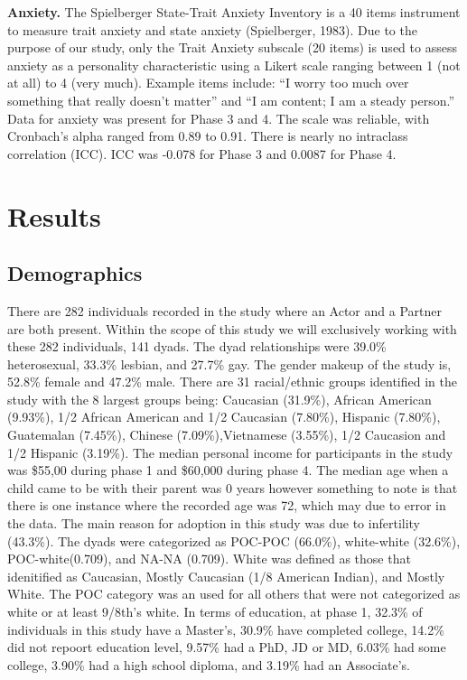 \documentclass[man]{apa6}
\begin{document}
\textbf{Anxiety.}
The Spielberger State-Trait Anxiety Inventory is a 40 items instrument to measure trait anxiety and state anxiety (Spielberger, 1983). Due to the purpose of our study, only the Trait Anxiety subscale (20 items) is used to assess anxiety as a personality characteristic using a Likert scale ranging between 1 (not at all) to 4 (very much). Example items include: \enquote{I worry too much over something that really doesn't matter} and \enquote{I am content; I am a steady person.} Data for anxiety was present for Phase 3 and 4. The scale was reliable, with Cronbach's alpha ranged from 0.89 to 0.91. There is nearly no intraclass correlation (ICC). ICC was -0.078 for Phase 3 and 0.0087 for Phase 4.

\hypertarget{results}{%
\section{Results}\label{results}}

\hypertarget{demographics}{%
\subsection{Demographics}\label{demographics}}

There are 282 individuals recorded in the study where an Actor and a Partner are both present. Within the scope of this study we will exclusively working with these 282 individuals, 141 dyads.
The dyad relationships were 39.0\% heterosexual, 33.3\% lesbian, and 27.7\% gay.
The gender makeup of the study is, 52.8\% female and 47.2\% male.
There are 31 racial/ethnic groups identified in the study with the 8 largest groups being: Caucasian (31.9\%), African American (9.93\%), 1/2 African American and 1/2 Caucasian (7.80\%), Hispanic (7.80\%), Guatemalan (7.45\%), Chinese (7.09\%),Vietnamese (3.55\%), 1/2 Caucasion and 1/2 Hispanic (3.19\%).
The median personal income for participants in the study was \$55,00 during phase 1 and \$60,000 during phase 4.
The median age when a child came to be with their parent was 0 years however something to note is that there is one instance where the recorded age was 72, which may due to error in the data.
The main reason for adoption in this study was due to infertility (43.3\%).
The dyads were categorized as POC-POC (66.0\%), white-white (32.6\%), POC-white(0.709), and NA-NA (0.709). White was defined as those that idenitified as Caucasian, Mostly Caucasian (1/8 American Indian), and Mostly White. The POC category was an used for all others that were not categorized as white or at least 9/8th's white.
In terms of education, at phase 1, 32.3\% of individuals in this study have a Master's, 30.9\% have completed college, 14.2\% did not repoort education level, 9.57\% had a PhD, JD or MD, 6.03\% had some college, 3.90\% had a high school diploma, and 3.19\% had an Associate's.
\end{document}
